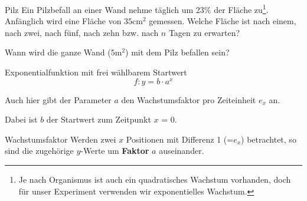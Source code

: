 \begin{beispiel}{Pilz}{}
  Ein Pilzbefall an einer Wand nehme täglich um 23\% der Fläche
  zu\footnote{Je nach Organismus ist auch ein quadratisches Wachstum
  vorhanden, doch für unser Experiment verwenden wir exponentielles Wachstum.}.
  Anfänglich wird eine Fläche von $35 \text{cm}^2$ gemessen.
  Welche Fläche ist nach einem, nach zwei, nach fünf, nach zehn
  bzw. nach $n$ 
  Tagen zu erwarten?


  Wann wird die ganze Wand ($5 \text{m}^2$) mit dem Pilz befallen
  sein?
  

\end{beispiel}

\newpage


\begin{definition}{Exponentialfunktion mit frei wählbarem Startwert}{}
$$f: y = b\cdot{}a^x$$

Auch hier gibt der Parameter $a$ den Wachstumsfaktor pro Zeiteinheit $e_x$ an.

Dabei ist $b$ der Startwert zum Zeitpunkt $x$ = 0.
\end{definition}



\begin{bemerkung}{Wachstumsfaktor}{}{}
Werden zwei $x$ Positionen mit Differenz 1 (=$e_x$) betrachtet, so sind
die zugehörige $y$-Werte um \textbf{Faktor} $a$ auseinander.
\end{bemerkung}

